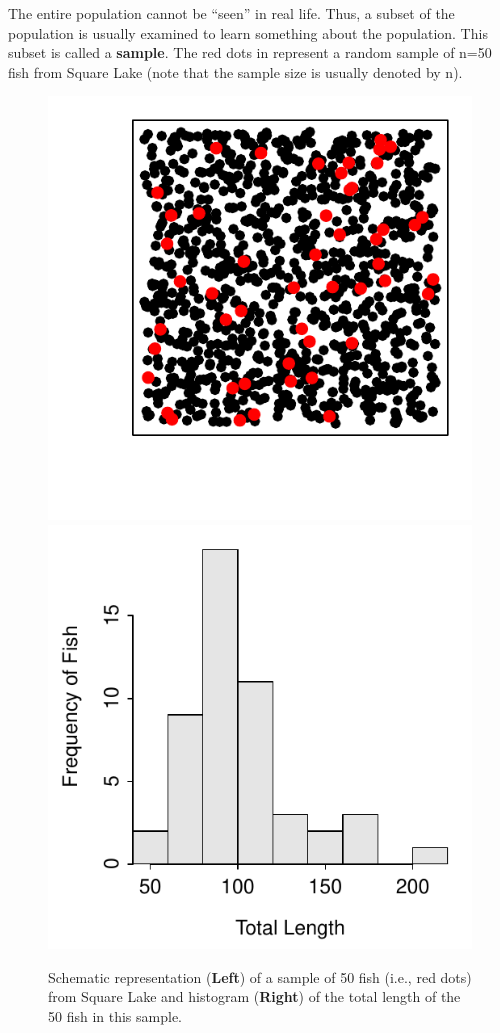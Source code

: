 \documentclass[10pt,openany]{book}\usepackage[]{graphicx}\usepackage[]{color}
\newenvironment{knitrout}{}{} %
\begin{document}

\vspace{-12pt}

The entire population cannot be ``seen'' in real life.  Thus, a subset of the population is usually examined to learn something about the population.  This subset is called a \textbf{sample}.  The red dots in  represent a random sample of n=50 fish from Square Lake (note that the sample size is usually denoted by n).

\begin{knitrout}
\color{fgcolor}\begin{figure}[hbtp]

{\centering \includegraphics[width=.4\linewidth]{Figs/SquareLakeSample1-1} 
\includegraphics[width=.4\linewidth]{Figs/SquareLakeSample1-2} 

}

\caption{Schematic representation (\textbf{Left}) of a sample of 50 fish (i.e., red dots) from Square Lake and histogram (\textbf{Right}) of the total length of the 50 fish in this sample.}\label{fig:SquareLakeSample1}
\end{figure}


\end{knitrout}
\end{document}
